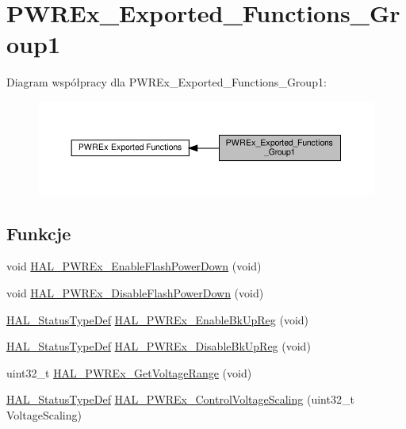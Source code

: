 \hypertarget{group___p_w_r_ex___exported___functions___group1}{}\section{P\+W\+R\+Ex\+\_\+\+Exported\+\_\+\+Functions\+\_\+\+Group1}
\label{group___p_w_r_ex___exported___functions___group1}
Diagram współpracy dla P\+W\+R\+Ex\+\_\+\+Exported\+\_\+\+Functions\+\_\+\+Group1\+:\nopagebreak
\begin{figure}[H]
\begin{center}
\leavevmode
\includegraphics[width=350pt]{group___p_w_r_ex___exported___functions___group1}
\end{center}
\end{figure}
\subsection*{Funkcje}
\begin{DoxyCompactItemize}
\item 
void \hyperlink{group___p_w_r_ex___exported___functions___group1_ga86c72a23f89c3c335ab784f42536b106}{H\+A\+L\+\_\+\+P\+W\+R\+Ex\+\_\+\+Enable\+Flash\+Power\+Down} (void)
\item 
void \hyperlink{group___p_w_r_ex___exported___functions___group1_ga12385932ad48ece7fde94d5c3db5cd19}{H\+A\+L\+\_\+\+P\+W\+R\+Ex\+\_\+\+Disable\+Flash\+Power\+Down} (void)
\item 
\hyperlink{stm32f4xx__hal__def_8h_a63c0679d1cb8b8c684fbb0632743478f}{H\+A\+L\+\_\+\+Status\+Type\+Def} \hyperlink{group___p_w_r_ex___exported___functions___group1_ga21165778ccc2144040c6a935c9f794a7}{H\+A\+L\+\_\+\+P\+W\+R\+Ex\+\_\+\+Enable\+Bk\+Up\+Reg} (void)
\item 
\hyperlink{stm32f4xx__hal__def_8h_a63c0679d1cb8b8c684fbb0632743478f}{H\+A\+L\+\_\+\+Status\+Type\+Def} \hyperlink{group___p_w_r_ex___exported___functions___group1_gae1b50407389e3ce1132eceb013f823d1}{H\+A\+L\+\_\+\+P\+W\+R\+Ex\+\_\+\+Disable\+Bk\+Up\+Reg} (void)
\item 
uint32\+\_\+t \hyperlink{group___p_w_r_ex___exported___functions___group1_ga2978c7160c8d166f1bf2bf39e4bf33f7}{H\+A\+L\+\_\+\+P\+W\+R\+Ex\+\_\+\+Get\+Voltage\+Range} (void)
\item 
\hyperlink{stm32f4xx__hal__def_8h_a63c0679d1cb8b8c684fbb0632743478f}{H\+A\+L\+\_\+\+Status\+Type\+Def} \hyperlink{group___p_w_r_ex___exported___functions___group1_ga1a1e616641c2dc696681ace585d9afb5}{H\+A\+L\+\_\+\+P\+W\+R\+Ex\+\_\+\+Control\+Voltage\+Scaling} (uint32\+\_\+t Voltage\+Scaling)
\end{DoxyCompactItemize}


